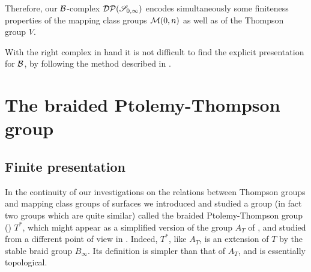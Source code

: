 \documentclass[twoside]{irmaems}
\theoremstyle{plain}
\theoremstyle{definition}
\theoremstyle{remark}
\newcommand{\B}{{{\cal B}}}
\begin{document}
\vspace{0.1cm}\noindent 
Therefore, our $\B$-complex  ${\cal DP}(\mathscr{S}_{0,\infty})$ encodes simultaneously some finiteness properties of 
the mapping class groups ${\cal M}(0,n)$ as well as of the Thompson group $V$.

\vspace{0.1cm}\noindent 
With the right complex in hand it is not difficult to find  
the explicit presentation for 
$\B$, by following the method described in \cite{br1}. 

  




\section{The braided Ptolemy-Thompson group}

\subsection{Finite presentation}\label{ptdef}

In the continuity of our investigations  on the relations between 
Thompson groups and mapping class groups of surfaces  
we introduced and studied a group (in fact two groups which are quite similar) called the braided Ptolemy-Thompson group (\cite{fu-ka2}) $T^*$, which might appear 
as a simplified version of the group $A_{T}$ of \cite{gr-se}, and studied 
from a different point of view in \cite{ka-se}. Indeed, 
$T^*$, like $A_{T}$, is an extension of $T$ by the stable braid group $B_{\infty}$. Its definition is simpler than 
that of $A_{T}$, and is essentially topological.
\end{document}
